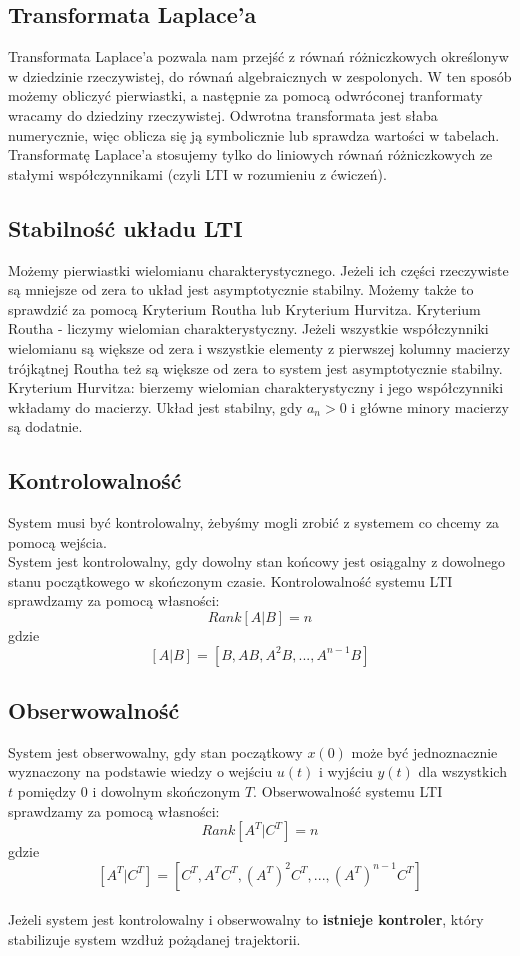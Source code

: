 \documentclass[12pt]{article}
\begin{document}
\subsection{Transformata Laplace'a}
Transformata Laplace'a pozwala nam przejść z równań różniczkowych określonyw w dziedzinie rzeczywistej, do równań algebraicznych w zespolonych. W ten sposób możemy obliczyć pierwiastki, a następnie za pomocą odwróconej tranformaty wracamy do dziedziny rzeczywistej. Odwrotna transformata jest słaba numerycznie, więc oblicza się ją symbolicznie lub sprawdza wartości w tabelach. Transformatę Laplace'a stosujemy tylko do liniowych równań różniczkowych ze stałymi współczynnikami (czyli LTI w rozumieniu z ćwiczeń). 

\subsection{Stabilność układu LTI}
Możemy pierwiastki wielomianu charakterystycznego. Jeżeli ich części rzeczywiste są mniejsze od zera to układ jest asymptotycznie stabilny. Możemy także to sprawdzić za pomocą Kryterium Routha lub Kryterium Hurvitza. Kryterium Routha - liczymy wielomian charakterystyczny. Jeżeli wszystkie współczynniki wielomianu są większe od zera i wszystkie elementy z pierwszej kolumny macierzy trójkątnej Routha też są większe od zera to system jest asymptotycznie stabilny. Kryterium Hurvitza: bierzemy wielomian charakterystyczny i jego współczynniki wkładamy do macierzy. Układ jest stabilny, gdy $a_{n} > 0$ i główne minory macierzy są dodatnie.

\subsection{Kontrolowalność}
System musi być kontrolowalny, żebyśmy mogli zrobić z systemem co chcemy za pomocą wejścia.\\
System jest kontrolowalny, gdy dowolny stan końcowy jest osiągalny z dowolnego stanu początkowego w skończonym czasie. Kontrolowalność systemu LTI sprawdzamy za pomocą własności: $$Rank[A|B] = n$$ gdzie $$[A|B] = [B, AB, A^{2}B,...,A^{n-1}B]$$

\subsection{Obserwowalność}
System jest obserwowalny, gdy stan początkowy $x(0)$ może być jednoznacznie wyznaczony na podstawie wiedzy o wejściu $u(t)$ i wyjściu $y(t)$ dla wszystkich $t$ pomiędzy 0 i dowolnym skończonym $T$. Obserwowalność systemu LTI sprawdzamy za pomocą własności: $$Rank[A^{T} | C^{T}] = n$$ gdzie $$[A^{T} | C^{T}] = [C^{T}, A^{T}C^{T},(A^{T})^{2}C^{T},...,(A^{T})^{n-1}C^{T}]$$
~\\
Jeżeli system jest kontrolowalny i obserwowalny to \textbf{istnieje kontroler}, który stabilizuje system wzdłuż pożądanej trajektorii.
\end{document}
